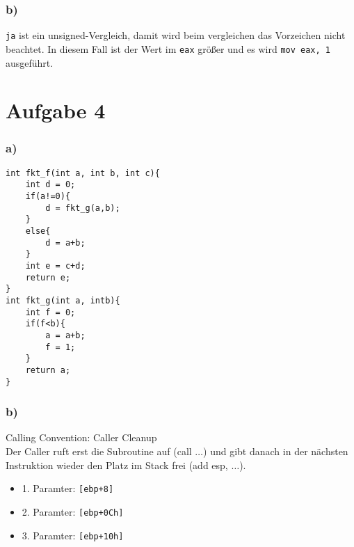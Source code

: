 \documentclass[]{scrreprt}
\begin{document}
\subsection*{b)}
\texttt{ja} ist ein unsigned-Vergleich, damit wird beim vergleichen das Vorzeichen nicht beachtet. In diesem Fall ist der Wert im \texttt{eax} größer und es wird \texttt{mov eax, 1} ausgeführt.
\chapter{Aufgabe 4}
\subsection*{a)}
\begin{lstlisting}[caption={Funktionen f und g},captionpos=b]
int fkt_f(int a, int b, int c){
	int d = 0;
	if(a!=0){
		d = fkt_g(a,b);
	}
	else{
		d = a+b;
	}
	int e = c+d;
	return e;
}
int fkt_g(int a, intb){
	int f = 0;
	if(f<b){
		a = a+b;
		f = 1;
	}
	return a;
}
\end{lstlisting}
\subsection*{b)}
Calling Convention: Caller Cleanup\\
Der Caller ruft erst die Subroutine auf (call $\dots$) und gibt danach in der nächsten Instruktion wieder den Platz im Stack frei (add esp, $\dots$).
\begin{itemize}
	\item 1. Paramter: \texttt{[ebp+8]}
	\item 2. Paramter: \texttt{[ebp+0Ch]}
	\item 3. Paramter: \texttt{[ebp+10h]}
\end{itemize}
\end{document}
